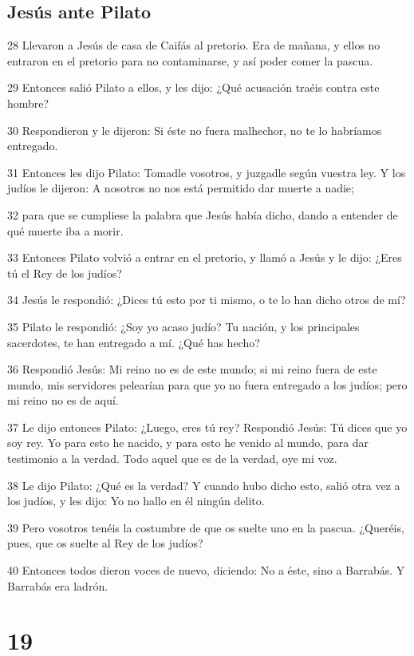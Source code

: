 \section*{Jesús ante Pilato}

\par 28 Llevaron a Jesús de casa de Caifás al pretorio. Era de mañana, y ellos no entraron en el pretorio para no contaminarse, y así poder comer la pascua.
\par 29 Entonces salió Pilato a ellos, y les dijo: ¿Qué acusación traéis contra este hombre?
\par 30 Respondieron y le dijeron: Si éste no fuera malhechor, no te lo habríamos entregado.
\par 31 Entonces les dijo Pilato: Tomadle vosotros, y juzgadle según vuestra ley. Y los judíos le dijeron: A nosotros no nos está permitido dar muerte a nadie;
\par 32 para que se cumpliese la palabra que Jesús había dicho, dando a entender de qué muerte iba a morir.
\par 33 Entonces Pilato volvió a entrar en el pretorio, y llamó a Jesús y le dijo: ¿Eres tú el Rey de los judíos?
\par 34 Jesús le respondió: ¿Dices tú esto por ti mismo, o te lo han dicho otros de mí?
\par 35 Pilato le respondió: ¿Soy yo acaso judío? Tu nación, y los principales sacerdotes, te han entregado a mí. ¿Qué has hecho?
\par 36 Respondió Jesús: Mi reino no es de este mundo; si mi reino fuera de este mundo, mis servidores pelearían para que yo no fuera entregado a los judíos; pero mi reino no es de aquí.
\par 37 Le dijo entonces Pilato: ¿Luego, eres tú rey? Respondió Jesús: Tú dices que yo soy rey. Yo para esto he nacido, y para esto he venido al mundo, para dar testimonio a la verdad. Todo aquel que es de la verdad, oye mi voz.
\par 38 Le dijo Pilato: ¿Qué es la verdad? Y cuando hubo dicho esto, salió otra vez a los judíos, y les dijo: Yo no hallo en él ningún delito.
\par 39 Pero vosotros tenéis la costumbre de que os suelte uno en la pascua. ¿Queréis, pues, que os suelte al Rey de los judíos?
\par 40 Entonces todos dieron voces de nuevo, diciendo: No a éste, sino a Barrabás. Y Barrabás era ladrón.

\chapter{19}

